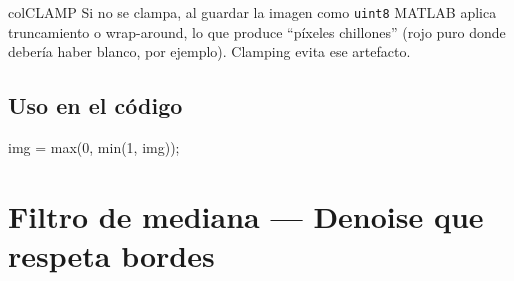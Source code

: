 \documentclass[11pt,a4paper]{article}
\begin{document}
\begin{keybox}{colCLAMP}
Si no se clampa, al guardar la imagen como \texttt{uint8} MATLAB aplica
truncamiento o wrap-around, lo que produce ``píxeles chillones'' (rojo puro
donde debería haber blanco, por ejemplo). Clamping evita ese artefacto.

\subsection*{Uso en el código}

\begin{codebox}
img = max(0, min(1, img));
\end{codebox}

\end{keybox}

\section{\textcolor{colMED}{Filtro de mediana} — Denoise que respeta bordes}
\end{document}
